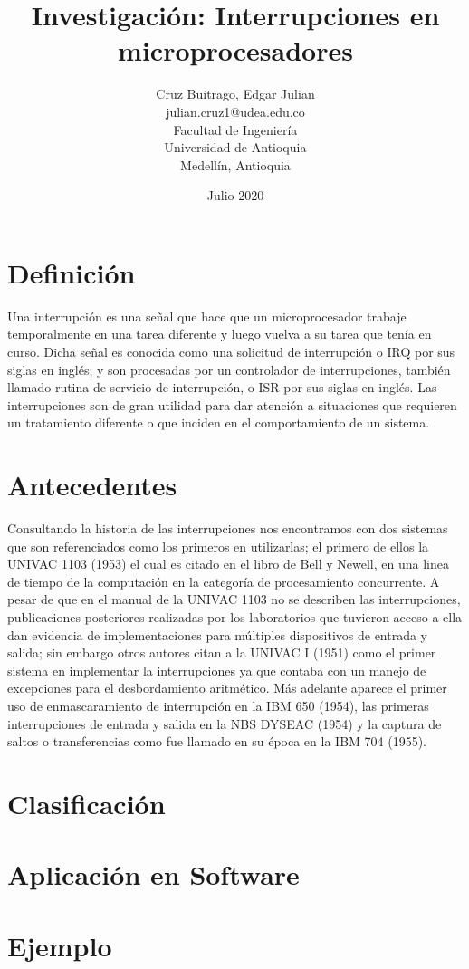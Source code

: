 \documentclass[]{article}
\title{Investigación: Interrupciones en microprocesadores}
\author{Cruz Buitrago, Edgar Julian \\ julian.cruz1@udea.edu.co \\ Facultad de Ingeniería \\ Universidad de Antioquia \\ Medellín, Antioquia}
\date{Julio 2020}
\begin{document}
\maketitle
\begin{multicols}{2}
	\begin{abstract}		
		
	\end{abstract}
	
	\section{Definición}
		Una interrupción es una señal que hace que un microprocesador trabaje temporalmente en una tarea diferente y luego vuelva a su tarea que tenía en curso.\cite{wikibooks}  Dicha señal es conocida como una solicitud de interrupción o IRQ por sus siglas en inglés; y son procesadas por un controlador de interrupciones, también llamado rutina de servicio de interrupción, o ISR por sus siglas en inglés.\cite{techterms}  Las interrupciones son de gran utilidad para dar atención a situaciones que requieren un tratamiento diferente o que inciden en el comportamiento de un sistema.
	\section{Antecedentes}
		Consultando la historia de las interrupciones nos encontramos con dos sistemas que son referenciados como los primeros en utilizarlas; el primero de ellos la UNIVAC 1103 (1953) el cual es citado en el libro de Bell y Newell, en una linea de tiempo de la computación en la categoría de procesamiento concurrente\cite{history2}.  A pesar de que en el manual de la UNIVAC 1103\cite{history3} no se describen las interrupciones, publicaciones posteriores realizadas por los laboratorios que tuvieron acceso a ella dan evidencia de implementaciones para múltiples dispositivos de entrada y salida; sin embargo otros autores citan a la UNIVAC I (1951) como el primer sistema en implementar la interrupciones ya que contaba con un manejo de excepciones para el desbordamiento aritmético.  Más adelante aparece el primer uso de enmascaramiento de interrupción en la IBM 650 (1954), las primeras interrupciones de entrada y salida en la NBS DYSEAC (1954) y la captura de saltos o transferencias como fue llamado en su época en la IBM 704 (1955).\cite{history}
	\section{Clasificación}
		
	\section{Aplicación en Software}
	\section{Ejemplo}
\end{multicols}
\end{document}
